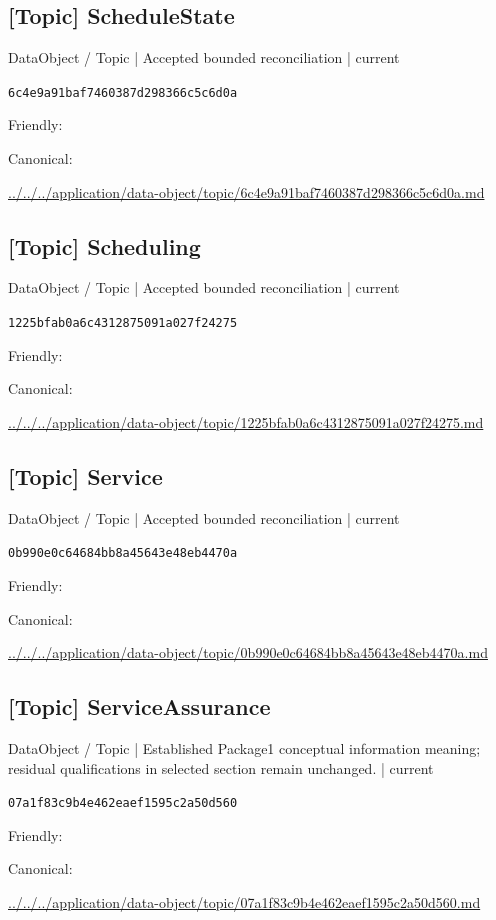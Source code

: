 \documentclass[10pt,a4paper]{article}
\begin{document}
\subsection*{[Topic] ScheduleState}
{\small DataObject / Topic | Accepted bounded reconciliation | current}\par
\texttt{6c4e9a91baf7460387d298366c5c6d0a}\par
Friendly: \par
Canonical: \par
{\footnotesize\url{../../../application/data-object/topic/6c4e9a91baf7460387d298366c5c6d0a.md}}\par
\subsection*{[Topic] Scheduling}
{\small DataObject / Topic | Accepted bounded reconciliation | current}\par
\texttt{1225bfab0a6c4312875091a027f24275}\par
Friendly: \par
Canonical: \par
{\footnotesize\url{../../../application/data-object/topic/1225bfab0a6c4312875091a027f24275.md}}\par
\subsection*{[Topic] Service}
{\small DataObject / Topic | Accepted bounded reconciliation | current}\par
\texttt{0b990e0c64684bb8a45643e48eb4470a}\par
Friendly: \par
Canonical: \par
{\footnotesize\url{../../../application/data-object/topic/0b990e0c64684bb8a45643e48eb4470a.md}}\par
\subsection*{[Topic] ServiceAssurance}
{\small DataObject / Topic | Established Package1 conceptual information meaning; residual qualifications in selected section remain unchanged. | current}\par
\texttt{07a1f83c9b4e462eaef1595c2a50d560}\par
Friendly: \par
Canonical: \par
{\footnotesize\url{../../../application/data-object/topic/07a1f83c9b4e462eaef1595c2a50d560.md}}\par
\end{document}
